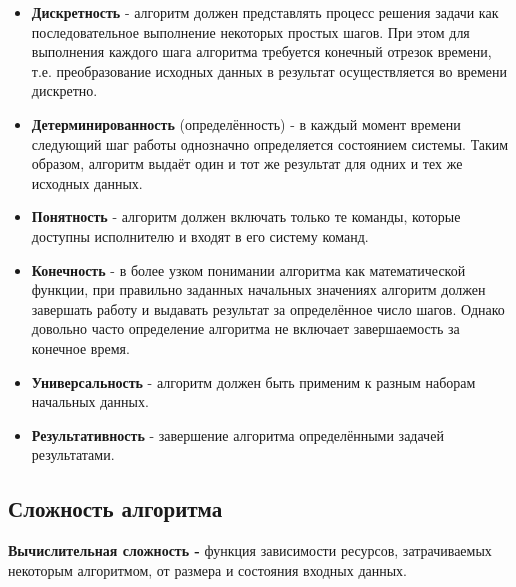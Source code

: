 \begin{itemize}
    \item 
        \begin{definition}
            \textbf{Дискретность} - алгоритм должен представлять процесс решения задачи как последовательное выполнение некоторых простых шагов. При этом для выполнения каждого шага алгоритма требуется конечный отрезок времени, т.е. преобразование исходных данных в результат осуществляется во времени дискретно.
        \end{definition}
    \item
        \begin{definition}
            \textbf{Детерминированность} (определённость) - в каждый момент времени следующий шаг работы однозначно определяется состоянием системы. Таким образом, алгоритм выдаёт один и тот же результат для одних и тех же исходных данных.
        \end{definition}
    \item 
        \begin{definition}
            \textbf{Понятность} - алгоритм должен включать только те команды, которые доступны исполнителю и входят в его систему команд.
        \end{definition}
    \item 
        \begin{definition}
            \textbf{Конечность} - в более узком понимании алгоритма как математической функции, при правильно заданных начальных значениях алгоритм должен завершать работу и выдавать результат за определённое число шагов. Однако довольно часто определение алгоритма не включает завершаемость за конечное время.
        \end{definition}
    \item 
        \begin{definition}
            \textbf{Универсальность} - алгоритм должен быть применим к разным наборам начальных данных.
        \end{definition}
    \item 
        \begin{definition}
            \textbf{Результативность} - завершение алгоритма определёнными задачей результатами.
        \end{definition}
\end{itemize}

\subsection{Сложность алгоритма}
\begin{definition}
    \textbf{Вычислительная сложность - } функция зависимости ресурсов, затрачиваемых некоторым алгоритмом, от размера и состояния входных данных.
\end{definition}

